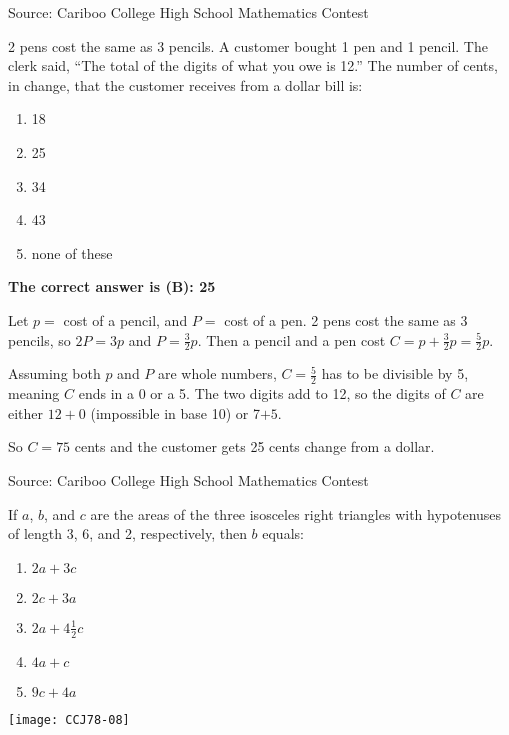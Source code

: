 \documentclass{article}
\begin{document}
\scriptsize
Source: Cariboo College High School Mathematics Contest

\normalsize
2 pens cost the same as 3 pencils. A customer bought 1 pen and 1 pencil. The clerk said, ``The total of the digits of what you owe is 12.'' The number of cents, in change, that the customer receives from a dollar bill is:
\begin{enumerate}[noitemsep,topsep=0mm, leftmargin=*,widest=D,label=\Alph*)]
	\item 18
	\item 25
	\item 34
	\item 43
	\item none of these
\end{enumerate}

\textbf{The correct answer is (B): 25}

Let $p=$ cost of a pencil, and $P=$ cost of a pen. 2 pens cost the same as 3 pencils, so $2P=3p$ and $P=\frac{3}{2}p$. Then a pencil and a pen cost $C=p+\frac{3}{2}p=\frac{5}{2}p$.

Assuming both $p$ and $P$ are whole numbers, $C=\frac{5}{2}$ has to be divisible by 5, meaning $C$ ends in a 0 or a 5. The two digits add to 12, so the digits of $C$ are either $12+0$ (impossible in base 10) or 7$+5$.

So $C=75$ cents and the customer gets 25 cents change from a dollar.

\vskip 1.5cm


\scriptsize
Source: Cariboo College High School Mathematics Contest

\normalsize
If $a$, $b$, and $c$ are the areas of the three isosceles right triangles with hypotenuses of length 3, 6, and 2, respectively, then $b$ equals:

\begin{minipage}[b]{0.5\textwidth}
\begin{enumerate}[noitemsep,topsep=0mm,leftmargin=*,widest=D,label=\Alph*)]
	\item $2a+3c$
	\item $2c+3a$
	\item $2a+4\frac{1}{2}c$
	\item $4a+c$
	\item $9c+4a$
\end{enumerate}
\end{minipage}
\begin{minipage}[b]{0.45\textwidth}
	\raggedleft
	\texttt{[image: CCJ78-08]}
\end{minipage}
\end{document}
